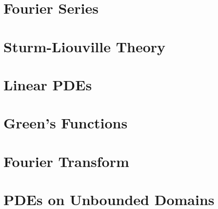 \documentclass[british,11pt,a4paper]{report}
\begin{document}
\maketitle
\tableofcontents

\chapter{Fourier Series}

\chapter{Sturm-Liouville Theory}

\chapter{Linear PDEs}

\chapter{Green's Functions}

\chapter{Fourier Transform}

\chapter{PDEs on Unbounded Domains}

\end{document}
